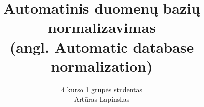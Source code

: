 \usepackage{VUMIF}
\title{\textbf{Automatinis duomenų bazių normalizavimas}\\(angl. Automatic database normalization)}
\author{
    4 kurso 1 grupės studentas \\
    Artūras Lapinskas
}
\usepackage{marvosym} %

